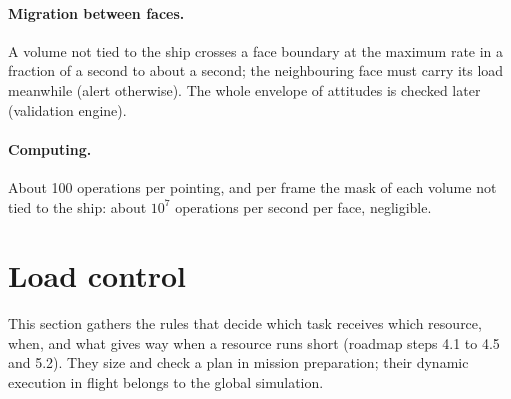 \documentclass[11pt,a4paper]{article}
\begin{document}
\paragraph{Migration between faces.} A volume not tied to the ship crosses a face boundary at the maximum rate in a
fraction of a second to about a second; the neighbouring face must carry its load meanwhile (alert otherwise). The
whole envelope of attitudes is checked later (validation engine).

\paragraph{Computing.} About 100 operations per pointing, and per frame the mask of each volume not tied to the ship:
about $10^7$ operations per second per face, negligible.

\section{Load control}\label{sec:load}
This section gathers the rules that decide which task receives which resource, when, and what gives way when a
resource runs short (roadmap steps 4.1 to 4.5 and 5.2). They size and check a plan in mission preparation; their
dynamic execution in flight belongs to the global simulation.
\end{document}
